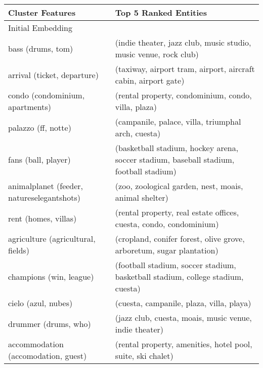 \begin{table}[]
	\scriptsize
	\setlength\extrarowheight{-1pt}
	\begin{tabular}{ll}
		\textbf{Cluster Features}                           & \textbf{Top 5 Ranked Entities}                                                                  \\
		\toprule
		Initial Embedding                     &                                                                                        \\
		bass (drums, tom)                          & (indie theater, jazz club, music studio, music venue, rock club)                       \\
		arrival (ticket, departure)                & (taxiway, airport tram, airport, aircraft cabin, airport gate)                         \\
		condo (condominium, apartments)            & (rental property, condominium, condo, villa, plaza)                                    \\
		palazzo (ff, notte)                        & (campanile, palace, villa, triumphal arch, cuesta)                                     \\
		fans (ball, player)                        & (basketball stadium, hockey arena, soccer stadium, baseball stadium, football stadium) \\
		animalplanet (feeder, natureselegantshots) & (zoo, zoological garden, nest, moais, animal shelter)                                  \\
		rent (homes, villas)                       & (rental property, real estate offices, cuesta, condo, condominium)                     \\
		agriculture (agricultural, fields)         & (cropland, conifer forest, olive grove, arboretum, sugar plantation)                   \\
		champions (win, league)                    & (football stadium, soccer stadium, basketball stadium, college stadium, cuesta)        \\
		cielo (azul, nubes)                        & (cuesta, campanile, plaza, villa, playa)                                               \\
		drummer (drums, who)                       & (jazz club, cuesta, moais, music venue, indie theater)                                 \\
		accommodation (accomodation, guest)        & (rental property, amenities, hotel pool, suite, ski chalet)                            \\

\end{tabular}
\end{table}
